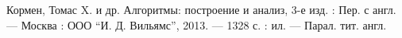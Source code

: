 \documentclass[main.tex]{subfiles}
\begin{document}
	\begin{thebibliography}{99}
		  Кормен, Томас X. и др.
		  Алгоритмы: построение и анализ, 3-е изд. : Пер. с англ. — Москва : ООО
		 “И. Д. Вильямс”, 2013. — 1328 с. : ил. — Парал. тит. англ.
	\end{thebibliography}
\end{document}
